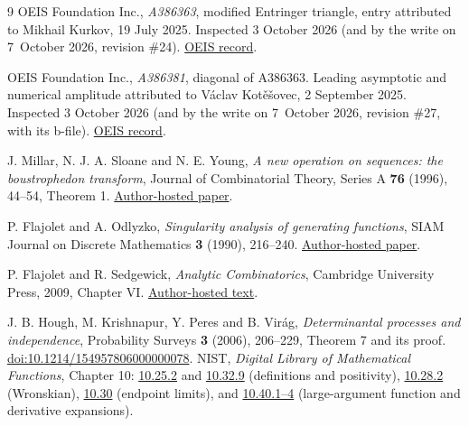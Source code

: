 \documentclass[11pt,letterpaper]{article}
\theoremstyle{remark}\newtheorem{remark}[theorem]{Remark}
\begin{document}
\begin{thebibliography}{9}
\small
\setlength{\itemsep}{3pt}
OEIS Foundation Inc., \emph{A386363}, modified Entringer triangle, entry attributed to Mikhail Kurkov, 19 July 2025. Inspected 3 October 2026 (and by the write on 7~October 2026, revision \#24).
\href{https://oeis.org/A386363}{OEIS record}.

OEIS Foundation Inc., \emph{A386381}, diagonal of A386363. Leading asymptotic and numerical amplitude attributed to V\'aclav Kot\v e\v sovec, 2 September 2025. Inspected 3 October 2026 (and by the write on 7~October 2026, revision \#27, with its b-file).
\href{https://oeis.org/A386381}{OEIS record}.

J. Millar, N. J. A. Sloane and N. E. Young,
\emph{A new operation on sequences: the boustrophedon transform},
Journal of Combinatorial Theory, Series A \textbf{76} (1996), 44--54, Theorem 1.
\href{https://neilsloane.com/doc/Me211.pdf}{Author-hosted paper}.

P. Flajolet and A. Odlyzko,
\emph{Singularity analysis of generating functions},
SIAM Journal on Discrete Mathematics \textbf{3} (1990), 216--240.
\href{https://algo.inria.fr/flajolet/Publications/FlOd90b.pdf}{Author-hosted paper}.

P. Flajolet and R. Sedgewick, \emph{Analytic Combinatorics},
Cambridge University Press, 2009, Chapter VI.
\href{https://algo.inria.fr/flajolet/Publications/book.pdf}{Author-hosted text}.

J. B. Hough, M. Krishnapur, Y. Peres and B. Vir\'ag,
\emph{Determinantal processes and independence},
Probability Surveys \textbf{3} (2006), 206--229, Theorem 7 and its proof.
\href{https://doi.org/10.1214/154957806000000078}{doi:10.1214/154957806000000078}.
NIST, \emph{Digital Library of Mathematical Functions}, Chapter 10:
\href{https://dlmf.nist.gov/10.25.E2}{10.25.2} and
\href{https://dlmf.nist.gov/10.32.E9}{10.32.9} (definitions and positivity),
\href{https://dlmf.nist.gov/10.28.E2}{10.28.2} (Wronskian),
\href{https://dlmf.nist.gov/10.30}{10.30} (endpoint limits), and
\href{https://dlmf.nist.gov/10.40}{10.40.1--4} (large-argument function and derivative expansions).

\end{thebibliography}
\end{document}
